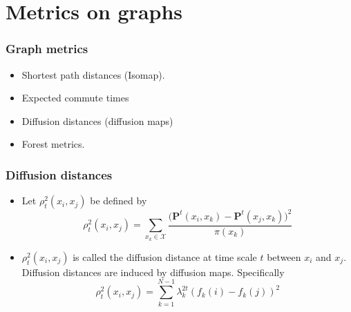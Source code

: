 \documentclass[professionalfonts,hyperref={colorlinks=true,linkcolor=red}]{beamer}
\begin{document}
\section{Metrics on graphs}
\begin{frame}
  \frametitle{Graph metrics}
  \begin{itemize}
  \item<2-> Shortest path distances (Isomap).
  \item<3-> Expected commute times
  \item<4-> Diffusion distances (diffusion maps)
  \item<5-> Forest metrics.
  \end{itemize}
\end{frame}
\begin{frame}[label=diffusion_distances]
  \frametitle{Diffusion distances}
  \begin{itemize}
  \item<1-> Let $\rho_{t}^{2}(x_i,x_j)$ be defined by
    \begin{equation}
      \label{eq:7}
      \rho_{t}^{2}(x_i,x_j) = \sum_{x_k \in \mathcal{X}}{
        \frac{\bigl(\bm{P}^{t}(x_i,x_k) -
          \bm{P}^{t}(x_j,x_k)\bigr)^2}{\pi(x_k)}}
    \end{equation}
  \item<2-> $\rho_{t}^2(x_i,x_j)$ is called the \alert{diffusion
      distance at time scale $t$} between $x_i$ and $x_j$. Diffusion
    distances are induced by diffusion maps. Specifically
    \begin{equation}
      \label{eq:8}
      \rho_{t}^{2}(x_i,x_j) = \sum_{k =
        1}^{N-1}{\lambda_k^{2t}(f_k(i) - f_k(j))^2} 
    \end{equation}
  \end{itemize}
\end{frame}
\end{document}
